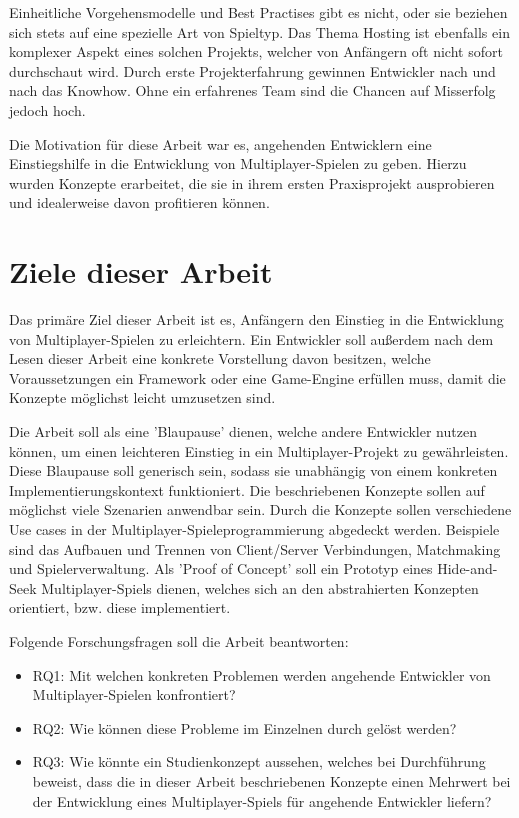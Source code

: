 Einheitliche Vorgehensmodelle und Best Practises gibt es nicht, oder sie beziehen sich stets auf eine spezielle Art von Spieltyp. Das Thema Hosting ist ebenfalls ein komplexer Aspekt eines solchen Projekts, welcher von Anfängern oft nicht sofort durchschaut wird. Durch erste Projekterfahrung gewinnen Entwickler nach und nach das Knowhow. Ohne ein erfahrenes Team sind die Chancen auf Misserfolg jedoch hoch. \cite{Payne.18.09.2019}

Die Motivation für diese Arbeit war es, angehenden Entwicklern eine Einstiegshilfe in die Entwicklung von Multiplayer-Spielen zu geben. Hierzu wurden Konzepte erarbeitet, die sie in ihrem ersten Praxisprojekt ausprobieren und idealerweise davon profitieren können.

\section{Ziele dieser Arbeit}

Das primäre Ziel dieser Arbeit ist es, Anfängern den Einstieg in die Entwicklung von Multiplayer-Spielen zu erleichtern. Ein Entwickler soll außerdem nach dem Lesen dieser Arbeit eine konkrete Vorstellung davon besitzen, welche Voraussetzungen ein Framework oder eine Game-Engine erfüllen muss, damit die Konzepte möglichst leicht umzusetzen sind.

Die Arbeit soll als eine 'Blaupause' dienen, welche andere Entwickler nutzen können, um einen leichteren Einstieg in ein Multiplayer-Projekt zu gewährleisten. Diese Blaupause soll generisch sein, sodass sie unabhängig von einem konkreten Implementierungskontext funktioniert. Die beschriebenen Konzepte sollen auf möglichst viele Szenarien anwendbar sein. Durch die Konzepte sollen verschiedene Use cases in der Multiplayer-Spieleprogrammierung abgedeckt werden. Beispiele sind das Aufbauen und Trennen von Client/Server Verbindungen, Matchmaking und Spielerverwaltung. Als 'Proof of Concept' soll ein Prototyp eines Hide-and-Seek Multiplayer-Spiels dienen, welches sich an den abstrahierten Konzepten orientiert, bzw. diese implementiert. 

Folgende Forschungsfragen soll die Arbeit beantworten:

\begin{itemize}
	\item \label{RQ1} RQ1: Mit welchen konkreten Problemen werden angehende Entwickler von Multiplayer-Spielen konfrontiert?
	\item \label{RQ2} RQ2: Wie können diese Probleme im Einzelnen durch gelöst werden?
	\item \label{RQ3} RQ3: Wie könnte ein Studienkonzept aussehen, welches bei Durchführung beweist, dass die in dieser Arbeit beschriebenen Konzepte einen Mehrwert bei der Entwicklung eines Multiplayer-Spiels für angehende Entwickler liefern?
\end{itemize}

